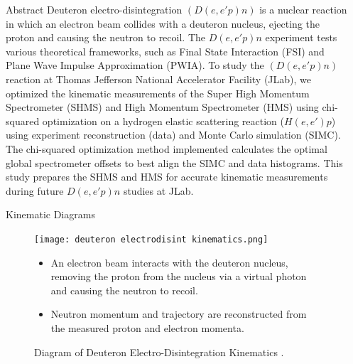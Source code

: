 \documentclass[final]{beamer}
\newlength{\sepwidth}
\newlength{\colwidth}
\newcommand{\separatorcolumn}{\begin{column}{\sepwidth}\end{column}}
\begin{document}
\begin{frame}[t]
\begin{columns}[t]
\separatorcolumn

\begin{column}{\colwidth}
\vspace{-.5cm}
  \begin{exampleblock}{Abstract}
    Deuteron electro-disintegration $(D(e,e'p)n)$ is a nuclear reaction in which an electron beam collides with a deuteron nucleus, ejecting the proton and causing the neutron to recoil. The $D(e,e'p)n$ experiment tests various theoretical frameworks, such as Final State Interaction (FSI) and Plane Wave Impulse Approximation (PWIA). To study the $(D(e, e'p)n)$ reaction at Thomas Jefferson National Accelerator Facility (JLab), we optimized the kinematic measurements of the Super High Momentum Spectrometer (SHMS) and High Momentum Spectrometer (HMS) using chi-squared optimization on a hydrogen elastic scattering reaction ($H(e,e')p$) using experiment reconstruction (data) and Monte Carlo simulation (SIMC). The chi-squared optimization method implemented calculates the optimal global spectrometer offsets to best align the SIMC and data histograms. This study prepares the SHMS and HMS for accurate kinematic measurements during future $D(e,e'p)n$ studies at JLab.
    \end{exampleblock}
\vspace{-0.5cm}
  \begin{block}{Kinematic Diagrams}
  \vspace{0cm}
  \begin{figure}
      \centering
      \texttt{[image: deuteron electrodisint kinematics.png]}
      \vspace{-1cm}
      \caption{Diagram of Deuteron Electro-Disintegration Kinematics \cite{yero2020thesis}.}
      \label{fig:deuteron-kinematics}
\vspace{-1cm}
\begin{itemize}
   \item An electron beam interacts with the deuteron nucleus, removing the proton from the nucleus via a virtual photon and causing the neutron to recoil.
   \item Neutron momentum and trajectory are reconstructed from the measured proton and electron momenta.
\end{itemize}
      \vspace{-.75cm}
      \begin{tikzpicture}[>=latex,scale=1.45]

\end{tikzpicture}
\end{figure}
\end{block}
\end{column}
\end{columns}
\end{frame}
\end{document}
